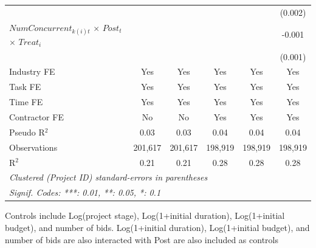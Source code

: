\documentclass[
]{article}
\begin{document}
\begin{table}[htbp]
\begin{tabular}{lccccc}
                                                                     &                &                &                &                & (0.002)\\   
      $NumConcurrent_{k(i)t}$ $\times$ $Post_t$ $\times$ $Treat_i$   &                &                &                &                & -0.001\\   
                                                                     &                &                &                &                & (0.001)\\   
      \midrule 
      Industry FE                                                    & Yes            & Yes            & Yes            & Yes            & Yes\\  
      Task FE                                                        & Yes            & Yes            & Yes            & Yes            & Yes\\  
      Time FE                                                        & Yes            & Yes            & Yes            & Yes            & Yes\\  
      Contractor FE                                                  & No             & No             & Yes            & Yes            & Yes\\  
      Pseudo R$^2$                                                   & 0.03           & 0.03           & 0.04           & 0.04           & 0.04\\  
      Observations                                                   & 201,617        & 201,617        & 198,919        & 198,919        & 198,919\\  
      R$^2$                                                          & 0.21           & 0.21           & 0.28           & 0.28           & 0.28\\  
      \midrule
      \multicolumn{6}{l}{\emph{Clustered (Project ID) standard-errors in parentheses}}\\
      \multicolumn{6}{l}{\emph{Signif. Codes: ***: 0.01, **: 0.05, *: 0.1}}\\
   \end{tabular}
   
   \par \raggedright 
   Controls include Log(project stage), Log(1+initial duration), Log(1+initial budget), and number of bids. Log(1+initial duration), Log(1+initial budget), and number of bids are also interacted with Post are also included as controls
\end{table}
\end{document}
